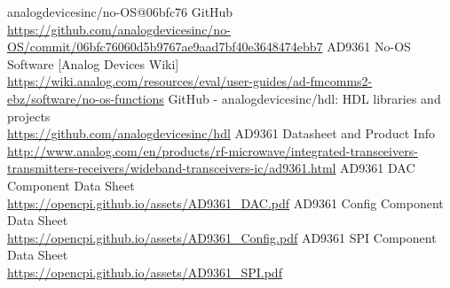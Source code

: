 \documentclass{article}
\begin{document}
\begin{thebibliography}{1}

 analogdevicesinc/no-OS@06bfc76 GitHub\\
\url{https://github.com/analogdevicesinc/no-OS/commit/06bfc76060d5b9767ae9aad7bf40e3648474ebb7}
 AD9361 No-OS Software [Analog Devices Wiki]\\
\url{https://wiki.analog.com/resources/eval/user-guides/ad-fmcomms2-ebz/software/no-os-functions}
 GitHub - analogdevicesinc/hdl: HDL libraries and projects \\
\url{https://github.com/analogdevicesinc/hdl}
 AD9361 Datasheet and Product Info \\
\url{http://www.analog.com/en/products/rf-microwave/integrated-transceivers-transmitters-receivers/wideband-transceivers-ic/ad9361.html}
 AD9361 DAC Component Data Sheet \\
\url{https://opencpi.github.io/assets/AD9361_DAC.pdf}
 AD9361 Config Component Data Sheet \\
\url{https://opencpi.github.io/assets/AD9361_Config.pdf}
 AD9361 SPI Component Data Sheet \\
\url{https://opencpi.github.io/assets/AD9361_SPI.pdf}

\end{thebibliography}
\end{document}

